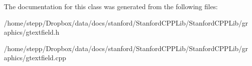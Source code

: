 The documentation for this class was generated from the following files\+:\begin{DoxyCompactItemize}
\item 
/home/stepp/\+Dropbox/data/docs/stanford/\+Stanford\+C\+P\+P\+Lib/\+Stanford\+C\+P\+P\+Lib/graphics/gtextfield.\+h\item 
/home/stepp/\+Dropbox/data/docs/stanford/\+Stanford\+C\+P\+P\+Lib/\+Stanford\+C\+P\+P\+Lib/graphics/gtextfield.\+cpp\end{DoxyCompactItemize}
